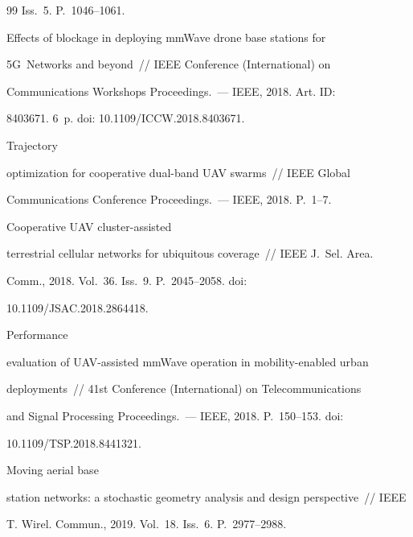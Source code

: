 {{\begin{thebibliography}{99}
Iss.~5. P.~1046--1061. 




 Effects of blockage in deploying mmWave drone base stations for 


5G~Networks and beyond~/\!\!/ IEEE  Conference (International)  on 


Communications Workshops Proceedings.~--- IEEE, 2018. Art. ID: 


8403671. 6~p. doi: 10.1109/ICCW.2018.8403671.




 Trajectory 


optimization for cooperative dual-band UAV swarms~/\!\!/ IEEE Global 


Communications Conference Proceedings.~--- IEEE, 2018. P.~1--7.




 Cooperative UAV cluster-assisted 


terrestrial cellular networks for ubiquitous coverage~/\!\!/ IEEE J.~Sel. Area. 


Comm., 2018. Vol.~36. Iss.~9. P.~2045--2058. doi: 


10.1109/JSAC.2018.2864418.




 Performance 


evaluation of UAV-assisted mmWave operation in mobility-enabled urban 


deployments~/\!\!/ 41st Conference (International) on Telecommunications 


and Signal Processing Proceedings.~--- IEEE, 2018. P.~150--153. doi: 


10.1109/TSP.2018.8441321.




 Moving aerial base 


station networks: a stochastic geometry analysis and design perspective~/\!\!/ IEEE 


T. Wirel. Commun., 2019. Vol.~18. Iss.~6. P.~2977--2988.




\end{thebibliography}}}

